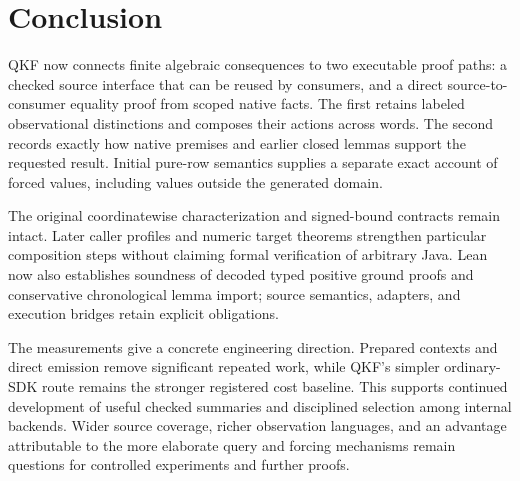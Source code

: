 \section{Conclusion}

QKF now connects finite algebraic consequences to two executable proof paths: a checked source interface that can be reused by consumers, and a direct source-to-consumer equality proof from scoped native facts. The first retains labeled observational distinctions and composes their actions across words. The second records exactly how native premises and earlier closed lemmas support the requested result. Initial pure-row semantics supplies a separate exact account of forced values, including values outside the generated domain.

The original coordinatewise characterization and signed-bound contracts remain intact. Later caller profiles and numeric target theorems strengthen particular composition steps without claiming formal verification of arbitrary Java. Lean now also establishes soundness of decoded typed positive ground proofs and conservative chronological lemma import; source semantics, adapters, and execution bridges retain explicit obligations.

The measurements give a concrete engineering direction. Prepared contexts and direct emission remove significant repeated work, while QKF's simpler ordinary-SDK route remains the stronger registered cost baseline. This supports continued development of useful checked summaries and disciplined selection among internal backends. Wider source coverage, richer observation languages, and an advantage attributable to the more elaborate query and forcing mechanisms remain questions for controlled experiments and further proofs.
